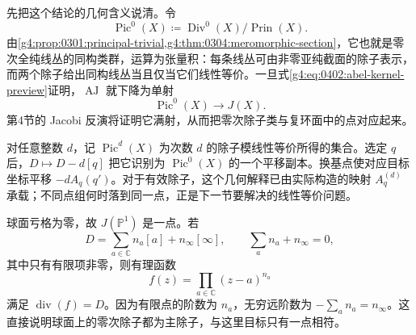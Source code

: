 \ProseParagraphBreak

先把这个结论的几何含义说清。令
\[
	\operatorname{Pic}^0(X)\coloneqq
	\operatorname{Div}^0(X)/\operatorname{Prin}(X).
\]
由\cref{g4:prop:0301:principal-trivial,g4:thm:0304:meromorphic-section}，它也就是零次全纯线丛的同构类群，运算为张量积：每条线丛可由非零亚纯截面的除子表示，而两个除子给出同构线丛当且仅当它们线性等价。一旦式\eqref{g4:eq:0402:abel-kernel-preview}证明，\(\operatorname{AJ}\) 就下降为单射
\[
	\operatorname{Pic}^0(X)\longrightarrow J(X).
\]
第4节的 Jacobi 反演将证明它满射，从而把零次除子类与复环面中的点对应起来。

\ProseParagraphBreak

对任意整数 \(d\)，记 \(\operatorname{Pic}^d(X)\) 为次数 \(d\) 的除子模线性等价所得的集合。选定 \(q\) 后，\(D\mapsto D-d[q]\) 把它识别为 \(\operatorname{Pic}^0(X)\) 的一个平移副本。换基点使对应目标坐标平移 \(-dA_q(q')\)。对于有效除子，这个几何解释已由实际构造的映射 \(A_q^{(d)}\) 承载；不同点组何时落到同一点，正是下一节要解决的线性等价问题。

\begin{example}
	\label{g4:exm:0402:sphere-divisors}
	球面亏格为零，故 \(J(\mathbb P^1)\) 是一点。若
	\[
		D=\sum_{a\in\mathbb C}n_a[a]+n_\infty[\infty],
		\qquad \sum_a n_a+n_\infty=0,
	\]
	其中只有有限项非零，则有理函数
	\[
		f(z)=\prod_{a\in\mathbb C}(z-a)^{n_a}
	\]
	满足 \(\operatorname{div}(f)=D\)。因为有限点的阶数为 \(n_a\)，无穷远阶数为 \(-\sum_a n_a=n_\infty\)。这直接说明球面上的零次除子都为主除子，与这里目标只有一点相符。
\end{example}
